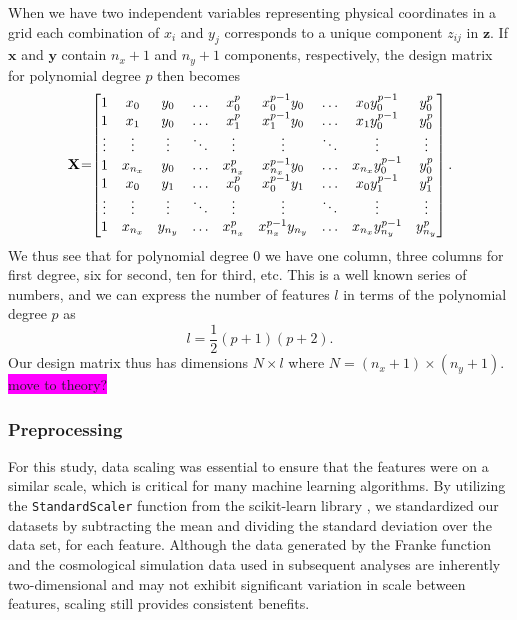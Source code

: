 \documentclass[aps,pra,english,notitlepage,reprint,nofootinbib]{revtex4-1}  %
\begin{document}
When we have two independent variables representing physical coordinates in a grid each combination of $x_i$ and $y_j$ corresponds to a unique component $z_{ij}$ in $\mathbf{z}$. If $\mathbf{x}$ and $\mathbf{y}$ contain $n_x+1$ and $n_y+1$ components, respectively, the design matrix for polynomial degree $p$ then becomes
\begin{equation*}
  \mathbf{X} \hspace{-2pt}=\hspace{-3pt}\begin{bmatrix}
    1 & x_0 & y_0 & \ldots&x_0^p & x_0^{p-1}y_0 &\ldots& x_0y_0^{p-1}&y_0^p
    \\
    1 & x_1 & y_0 & \ldots & x_1^p & x_1^{p-1}y_0 &\ldots& x_1y_0^{p-1}&y_0^p
    \\
    \vdots&\vdots&\vdots&\ddots&\vdots&\vdots&\ddots&\vdots&\vdots
    \\
    1 & x_{n_x} & y_{0} & \ldots&x_{n_x}^p & x_{n_x}^{p-1}y_0 &\ldots& x_{n_x}y_0^{p-1}&y_0^p
    \\
    1 & x_0 & y_1 & \ldots& x_0^p & x_0^{p-1}y_1 &\ldots& x_0y_1^{p-1}&y_1^p
    \\
    \vdots&\vdots&\vdots&\ddots&\vdots&\vdots&\ddots&\vdots&\vdots
    \\
    1 & x_{n_x} & y_{n_y} & \ldots& x_{n_x}^p & x_{n_x}^{p-1}y_{n_y} &\ldots& x_{n_x}y_{n_y}^{p-1}&y_{n_y}^p
  \end{bmatrix}.
\end{equation*}
We thus see that for polynomial degree 0 we have one column, three columns for first degree, six for second, ten for third, etc. This is a well known series of numbers, and we can express the number of features $l$ in terms of the polynomial degree $p$ as
\begin{equation*}
  l = \frac{1}{2}(p+1)(p+2).
\end{equation*}
Our design matrix thus has dimensions $N\times l$ where $N=(n_x+1)\times(n_y+1)$.
\colorbox{magenta}{move to theory?}


\subsubsection{Preprocessing}
For this study, data scaling was essential to ensure that the features were on a similar scale, which is critical for many machine learning algorithms. By utilizing the \verb|StandardScaler| function from the scikit-learn library \cite{scikit-learn}, we standardized our datasets by subtracting the mean and dividing the standard deviation over the data set, for each feature. Although the data generated by the Franke function and the cosmological simulation data used in subsequent analyses are inherently two-dimensional and may not exhibit significant variation in scale between features, scaling still provides consistent benefits.
\end{document}
